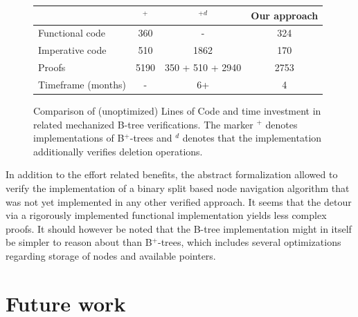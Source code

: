 \begin{figure}
    \centering
    \begin{tabular}{l|c|c|c}
        \                & \parencite{DBLP:conf/popl/MalechaMSW10}$^{+}$ & \parencite{DBLP:journals/sosym/ErnstSR15}$^{+d}$ & Our approach \\
        \hline
        Functional code &   360      & -                    & 324  \\
        Imperative code &   510      & 1862                  & 170  \\
        Proofs          &  5190      & 350 + 510 + 2940\footnotemark[7] & 2753 \\
        Timeframe (months) &  -     & 6+                      & 4   \\
    \end{tabular}
    \caption[Comparison of (unoptimized) Lines of Code and time investment in related mechanized B-tree verifications.]
    {Comparison of (unoptimized) Lines of Code and time investment in related mechanized B-tree verifications.
    The marker $^+$ denotes implementations of B$^+$-trees
    and $^d$ denotes that the implementation additionally verifies deletion operations.
    }
    \label{fig:proof-comparison}
\end{figure}

In addition to the effort related benefits, the abstract formalization allowed to
verify the implementation of a binary split based node navigation
algorithm that was not yet implemented in any other verified approach.
It seems that the detour via a rigorously implemented
functional implementation yields less complex proofs.
It should however be noted that the B-tree implementation
might in itself be simpler to reason about than B$^+$-trees,
which includes several optimizations regarding
storage of nodes and available pointers.

\section{Future work}


